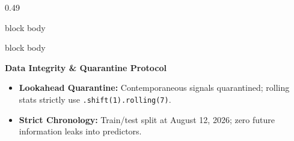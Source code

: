 \documentclass[aspectratio=169, 10pt]{beamer}
\newenvironment{card}[1][]{%
        \begin{beamercolorbox}[rounded=true,shadow=false,wd=\linewidth,sep=3.5pt,#1]{block body}%
        \fontsize{7.8pt}{9.8pt}\selectfont%
    }{%
        \end{beamercolorbox}%
    }
\begin{document}
\begin{frame}[t]
\begin{columns}[T]
\begin{column}{0.49\textwidth}
\begin{card}
                \end{card}                                                                                                                                                                             
                \vspace{0.14cm}                                                                                                                                                                        
                \begin{card}                                                                                                                                                                           
                    \textbf{\color{CoralAccent}Data Integrity \& Quarantine Protocol}\\[0.03cm]                                                                                                        
                    \begin{itemize}\setlength{\itemsep}{1.2pt}                                                                                                                                         
                        \item \textbf{Lookahead Quarantine:} Contemporaneous signals quarantined; rolling stats strictly use \texttt{.shift(1).rolling(7)}.                                            
                        \item \textbf{Strict Chronology:} Train/test split at August 12, 2026; zero future information leaks into predictors.                                                          
                    \end{itemize}                                                                                                                                                                      
                \end{card}                                                                                                                                                                             
            \end{column}                                                                                                                                                                               
        \end{columns}                                                                                                                                                                                  
    \end{frame}                                                                                                                                                                                        
                                                                                                                                                                                                       
\end{document}
